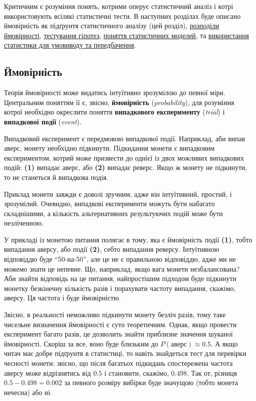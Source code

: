 \documentclass[
  11pt,
]{book}
\begin{document}
Критичним є розуміння понять, котрими оперує статистичний аналіз і котрі використовують всілякі статистичні тести. В наступних розділах буде описано ймовірність як підґрунтя статистичного аналізу (цей розділ), \hyperref[pdf-pmf]{розподіли ймовірності}, \hyperref[basic-hypotheses]{тестування гіпотез}, \hyperref[stat-models]{поняття статистичних моделей}, та \hyperref[infer]{використання статистики для умовиводу та передбачення}.

\subsection{Ймовірність}\label{prob}

Теорія ймовірності може видатись інтуїтивно зрозумілою до певної міри. Центральним поняттям її є, звісно, \textbf{ймовірність} (\emph{probability}), для розуміння котрої необхідно окреслити поняття \textbf{випадкового експерименту} (\emph{trial}) і \textbf{випадкової події} (\emph{event}).

Випадковий експеримент є передмовою випадкової події. Наприклад, аби випав аверс, монету необхідно підкинути. Підкидання монети є випадковим експериментом, котрий може призвести до однієї із двох можливих випадкових подій: \textbf{(1)} випадає аверс, або \textbf{(2)} випадає реверс. Якщо ж монету не підкинути, то не станеться й випадкова подія.

Приклад монети завжди є доволі зручним, адже він інтуїтивний, простий, і зрозумілий. Очевидно, випадкові експерименти можуть бути набагато складнішими, а кількість альтернативних результуючих подій може бути незліченною.

У прикладі із монетою питання полягає в тому, яка є ймовірність події \textbf{(1)}, тобто випадання аверсу, або події \textbf{(2)}, себто випадання реверсу. Інтуїтивною відповіддю буде ``50-на-50'', але це не є правильною відповіддю, адже ми не можемо знати це непевне. Що, наприклад, якщо вага монети незбалансована? Аби знайти відповідь на це питання, найпростішим підходом буде підкинути монетку безкінечну кількість разів і порахувати частоту випадання, скажімо, аверсу. Ця частота і буде ймовірністю.

Звісно, в реальності неможливо підкинути монету безліч разів, тому таке чисельне визначення ймовірності є суто теоретичним. Однак, якщо провести експеримент багато разів, це дозволить знайти приблизне значення шуканої ймовірності. Скоріш за все, воно буде близьким до \(P(аверс) \approx 0.5\). А якщо читач має добре підґрунтя в статистиці, то навіть знайдеться тест для перевірки чесності монети: звісно, що після багатьох підкидань спостережена частота аверсу може відрізнятись від \(0.5\) і становити, скажімо, \(0.498\). Так от, різниця \(0.5 - 0.498 = 0.002\) за певного розміру вибірки буде значущою (тобто монета нечесна) або ні.
\end{document}
